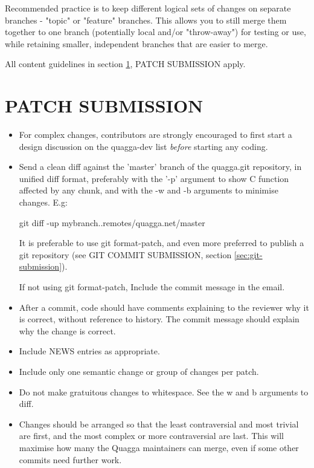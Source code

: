 \documentclass[oneside]{article}
\begin{document}
Recommended practice is to keep different logical sets of changes on
separate branches - "topic" or "feature" branches.  This allows you to still
merge them together to one branch (potentially local and/or "throw-away")
for testing or use, while retaining smaller, independent branches that are
easier to merge.

All content guidelines in section \ref{sec:patch-submission}, PATCH
SUBMISSION apply.


\section{PATCH SUBMISSION}
\label{sec:patch-submission}

\begin{itemize}

\item For complex changes, contributors are strongly encouraged to first
      start a design discussion on the quagga-dev list \emph{before}
      starting any coding.

\item Send a clean diff against the 'master' branch of the quagga.git
      repository, in unified diff format, preferably with the '-p' argument to
      show C function affected by any chunk, and with the -w and -b arguments to
      minimise changes. E.g:

     git diff -up mybranch..remotes/quagga.net/master

     It is preferable to use git format-patch, and even more preferred to
     publish a git repository (see GIT COMMIT SUBMISSION, section
     \ref{sec:git-submission}).

     If not using git format-patch, Include the commit message in the email.

\item After a commit, code should have comments explaining to the reviewer
      why it is correct, without reference to history.  The commit message
      should explain why the change is correct.

\item Include NEWS entries as appropriate.

\item Include only one semantic change or group of changes per patch.

\item Do not make gratuitous changes to whitespace. See the w and b arguments
      to diff.

\item Changes should be arranged so that the least contraversial and most
      trivial are first, and the most complex or more contraversial are
      last.  This will maximise how many the Quagga maintainers can merge,
      even if some other commits need further work.


\end{itemize}
\end{document}
